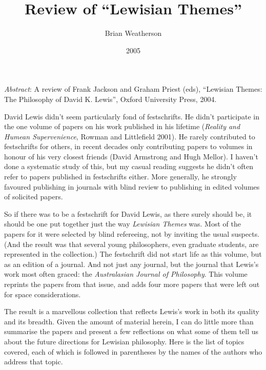 \documentclass[
  11pt,
  letterpaper,
  DIV=11,
  numbers=noendperiod,
  twoside]{scrartcl}
\title{Review of ``Lewisian Themes''}
\author{Brian Weatherson}
\date{2005}
\renewenvironment{abstract}
 {\vspace{-1.25cm}
 \quotation\small\noindent\emph{Abstract}:}
 {\endquotation}
\renewenvironment{abstract}
 {\quotation\small\noindent\emph{Abstract}:}
 {\endquotation\vspace{-0.02cm}}
\begin{document}
\maketitle
\begin{abstract}
A review of Frank Jackson and Graham Priest (eds), ``Lewisian Themes:
The Philosophy of David K. Lewis'', Oxford University Press, 2004.
\end{abstract}


David Lewis didn't seem particularly fond of festschrifts. He didn't
participate in the one volume of papers on his work published in his
lifetime (\emph{Reality and Humean Supervenience}, Rowman and
Littlefield 2001). He rarely contributed to festschrifts for others, in
recent decades only contributing papers to volumes in honour of his very
closest friends (David Armstrong and Hugh Mellor). I haven't done a
systematic study of this, but my casual reading suggests he didn't often
refer to papers published in festschrifts either. More generally, he
strongly favoured publishing in journals with blind review to publishing
in edited volumes of solicited papers.

So if there was to be a festschrift for David Lewis, as there surely
should be, it should be one put together just the way \emph{Lewisian
Themes} was. Most of the papers for it were selected by blind
refereeing, not by inviting the usual suspects. (And the result was that
several young philosophers, even graduate students, are represented in
the collection.) The festschrift did not start life as this volume, but
as an edition of a journal. And not just any journal, but the journal
that Lewis's work most often graced: the \emph{Australasian Journal of
Philosophy}. This volume reprints the papers from that issue, and adds
four more papers that were left out for space considerations.

The result is a marvellous collection that reflects Lewis's work in both
its quality and its breadth. Given the amount of material herein, I can
do little more than summarise the papers and present a few reflections
on what some of them tell us about the future directions for Lewisian
philosophy. Here is the list of topics covered, each of which is
followed in parentheses by the names of the authors who address that
topic.
\end{document}
